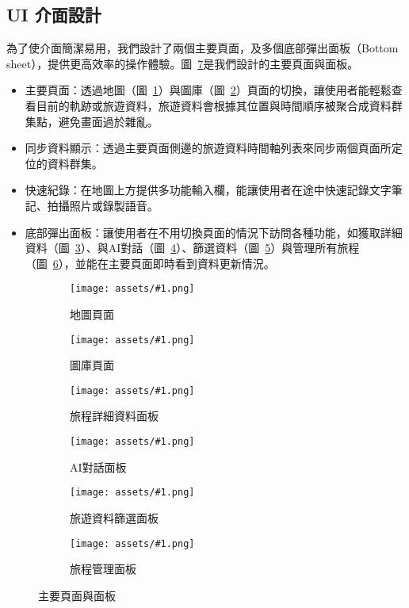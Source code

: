 \subsection{UI 介面設計}

為了使介面簡潔易用，我們設計了兩個主要頁面，及多個底部彈出面板（Bottom sheet），提供更高效率的操作體驗。圖~\ref{主要頁面與面板}是我們設計的主要頁面與面板。

\begin{itemize}
    \item 主要頁面：透過地圖（圖~\ref{地圖頁面}）與圖庫（圖~\ref{圖庫頁面}）頁面的切換，讓使用者能輕鬆查看目前的軌跡或旅遊資料，旅遊資料會根據其位置與時間順序被聚合成資料群集點，避免畫面過於雜亂。
    \item 同步資料顯示：透過主要頁面側邊的旅遊資料時間軸列表來同步兩個頁面所定位的資料群集。
    \item 快速紀錄：在地圖上方提供多功能輸入欄，能讓使用者在途中快速記錄文字筆記、拍攝照片或錄製語音。
    \item 底部彈出面板：讓使用者在不用切換頁面的情況下訪問各種功能，如獲取詳細資料（圖~\ref{旅程詳細資料面板}）、與AI對話（圖~\ref{AI對話面板}）、篩選資料（圖~\ref{旅遊資料篩選面板}）與管理所有旅程（圖~\ref{旅程管理面板}），並能在主要頁面即時看到資料更新情況。
\end{itemize}

\newcommand{\customsubfig}[2]{
    \hspace{0.005\textwidth}
    \begin{subfigure}[t]{0.13\textwidth}
        \centering
        \texttt{[image: assets/\#1.png]}
        \caption{#2}
        \label{#2}
    \end{subfigure}
    \hspace{0.005\textwidth}
}

\begin{figure}[H]
    \centering
    \customsubfig{地圖頁面}{地圖頁面}
    \customsubfig{圖庫頁面}{圖庫頁面}
    \customsubfig{旅程詳細資料面板-統計資料}{旅程詳細資料面板}
    \customsubfig{AI對話面板-聊天}{AI對話面板}
    \customsubfig{旅遊資料篩選面板}{旅遊資料篩選面板}
    \customsubfig{旅程管理面板}{旅程管理面板}

    \caption{主要頁面與面板}
    \label{主要頁面與面板}
\end{figure}

\let\customsubfig\relax

